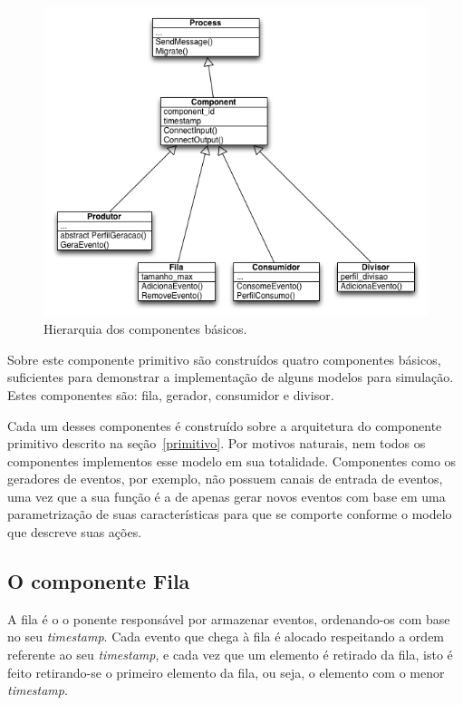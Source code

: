 \begin{figure}
  \centerline{\includegraphics{uml_componentes.png}}
  \caption{Hierarquia dos componentes básicos.}
\label{fig:uml_components}
\end{figure}

Sobre este componente primitivo são construídos quatro componentes básicos, suficientes para demonstrar a implementação de alguns modelos para simulação. Estes componentes são: fila, gerador, consumidor e divisor.

Cada um desses componentes é construído sobre a arquitetura do componente primitivo descrito na seção~\ref{primitivo}. Por motivos naturais, nem todos os componentes implementos esse modelo em sua totalidade. Componentes como os geradores de eventos, por exemplo, não possuem canais de entrada de eventos, uma vez que a sua função é a de apenas gerar novos eventos com base em uma parametrização de suas características para que se comporte conforme o modelo que descreve suas ações. 

\subsection{O componente Fila}

A fila é o o ponente responsável por armazenar eventos, ordenando-os com base no seu \textit{timestamp}. Cada evento que chega à fila é alocado respeitando a ordem referente ao seu \textit{timestamp}, e cada vez que um elemento é retirado da fila, isto é feito retirando-se o primeiro elemento da fila, ou seja, o elemento com o menor \textit{timestamp}. 

